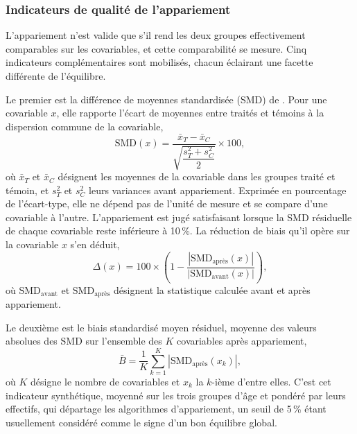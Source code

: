 \subsubsection{Indicateurs de qualité de l'appariement}
\label{subsec:qualite_appariement}

L'appariement n'est valide que s'il rend les deux groupes effectivement
comparables sur les covariables, et cette comparabilité se mesure. Cinq
indicateurs complémentaires sont mobilisés, chacun éclairant une facette
différente de l'équilibre.

Le premier est la différence de moyennes standardisée (SMD) de
\textcite{rosenbaum1985}. Pour une covariable $x$, elle rapporte l'écart de
moyennes entre traités et témoins à la dispersion commune de la covariable,
\begin{equation}
  \mathrm{SMD}(x) = \frac{\bar{x}_T - \bar{x}_C}
       {\sqrt{\dfrac{s_T^2 + s_C^2}{2}}} \times 100,
  \label{eq:smd}
\end{equation}
où $\bar{x}_T$ et $\bar{x}_C$ désignent les moyennes de la covariable dans
les groupes traité et témoin, et $s_T^2$ et $s_C^2$ leurs variances avant
appariement. Exprimée en pourcentage de l'écart-type, elle ne dépend pas de
l'unité de mesure et se compare d'une covariable à l'autre. L'appariement
est jugé satisfaisant lorsque la SMD résiduelle de chaque covariable reste
inférieure à 10\,\%. La réduction de biais qu'il opère sur la covariable
$x$ s'en déduit,
\begin{equation}
  \Delta(x) = 100 \times
  \left(1 - \frac{\left|\mathrm{SMD}_{\text{après}}(x)\right|}
                 {\left|\mathrm{SMD}_{\text{avant}}(x)\right|}\right),
  \label{eq:reduction_biais}
\end{equation}
où $\mathrm{SMD}_{\text{avant}}$ et $\mathrm{SMD}_{\text{après}}$
désignent la statistique calculée avant et après appariement.

Le deuxième est le biais standardisé moyen résiduel, moyenne des valeurs
absolues des SMD sur l'ensemble des $K$ covariables après appariement,
\begin{equation}
  \bar{B} = \frac{1}{K} \sum_{k=1}^{K}
            \left|\mathrm{SMD}_{\text{après}}(x_k)\right|,
  \label{eq:biais_moyen}
\end{equation}
où $K$ désigne le nombre de covariables et $x_k$ la $k$-ième d'entre
elles. C'est cet indicateur synthétique, moyenné sur les trois groupes d'âge et
pondéré par leurs effectifs, qui départage les algorithmes d'appariement,
un seuil de 5\,\% étant usuellement considéré comme le signe d'un bon
équilibre global.


